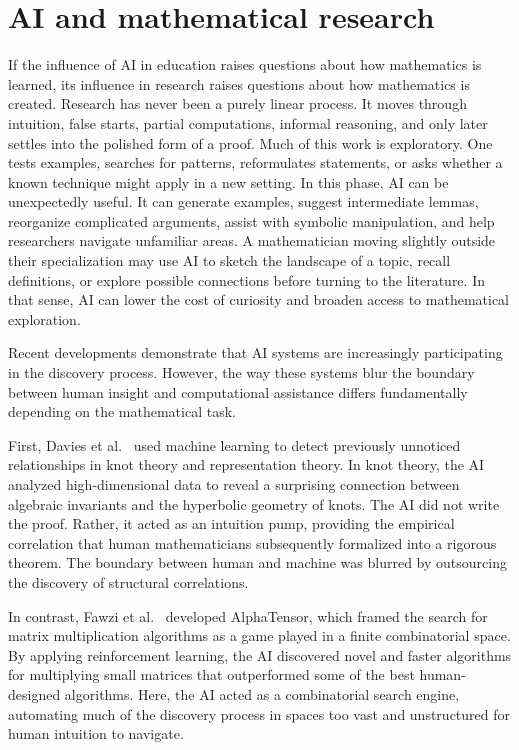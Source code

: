 \documentclass[12pt]{article}
\begin{document}
\section{AI and mathematical research}
If the influence of AI in education raises questions about how mathematics is learned, its influence in research raises questions about how mathematics is created. Research has never been a purely linear process. It moves through intuition, false starts, partial computations, informal reasoning, and only later settles into the polished form of a proof. Much of this work is exploratory. One tests examples, searches for patterns, reformulates statements, or asks whether a known technique might apply in a new setting. In this phase, AI can be unexpectedly useful. It can generate examples, suggest intermediate lemmas, reorganize complicated arguments, assist with symbolic manipulation, and help researchers navigate unfamiliar areas. A mathematician moving slightly outside their specialization may use AI to sketch the landscape of a topic, recall definitions, or explore possible connections before turning to the literature. In that sense, AI can lower the cost of curiosity and broaden access to mathematical exploration.

Recent developments demonstrate that AI systems are increasingly participating in the discovery process. However, the way these systems blur the boundary between human insight and computational assistance differs fundamentally depending on the mathematical task.

First, Davies et al.~\cite{davies2021} used machine learning to detect previously unnoticed relationships in knot theory and representation theory. In knot theory, the AI analyzed high-dimensional data to reveal a surprising connection between algebraic invariants and the hyperbolic geometry of knots. The AI did not write the proof. Rather, it acted as an intuition pump, providing the empirical correlation that human mathematicians subsequently formalized into a rigorous theorem. The boundary between human and machine was blurred by outsourcing the discovery of structural correlations.

In contrast, Fawzi et al.~\cite{fawzi2022} developed AlphaTensor, which framed the search for matrix multiplication algorithms as a game played in a finite combinatorial space. By applying reinforcement learning, the AI discovered novel and faster algorithms for multiplying small matrices that outperformed some of the best human-designed algorithms. Here, the AI acted as a combinatorial search engine, automating much of the discovery process in spaces too vast and unstructured for human intuition to navigate.
\end{document}
